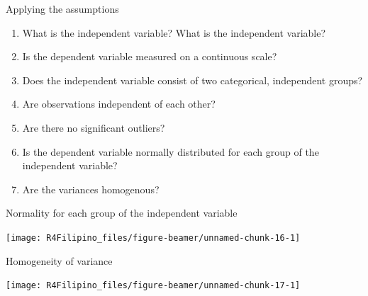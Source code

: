 \begin{frame}{Applying the assumptions}

\begin{enumerate}
\def\labelenumi{\arabic{enumi}.}
\tightlist
\item
  What is the independent variable? What is the independent variable?
\item
  Is the dependent variable measured on a continuous scale?
\item
  Does the independent variable consist of two categorical, independent
  groups?
\item
  Are observations independent of each other?
\item
  Are there no significant outliers?
\item
  Is the dependent variable normally distributed for each group of the
  independent variable?
\item
  Are the variances homogenous?
\end{enumerate}

\end{frame}

\begin{frame}[fragile]{Normality for each group of the independent
variable}

\begin{Shaded}
\begin{Highlighting}[]
\NormalTok{(}\OperatorTok{+}\StringTok{ }\NormalTok{(} \NormalTok{) }\OperatorTok{+}\StringTok{ }\NormalTok{(}\OperatorTok{~} \NormalTok{)}
\end{Highlighting}
\end{Shaded}

\begin{center}\texttt{[image: R4Filipino\_files/figure-beamer/unnamed-chunk-16-1]} \end{center}

\end{frame}

\begin{frame}[fragile]{Homogeneity of variance}

\begin{Shaded}
\begin{Highlighting}[]
\end{Highlighting}
\end{Shaded}

\begin{center}\texttt{[image: R4Filipino\_files/figure-beamer/unnamed-chunk-17-1]} \end{center}

\end{frame}

